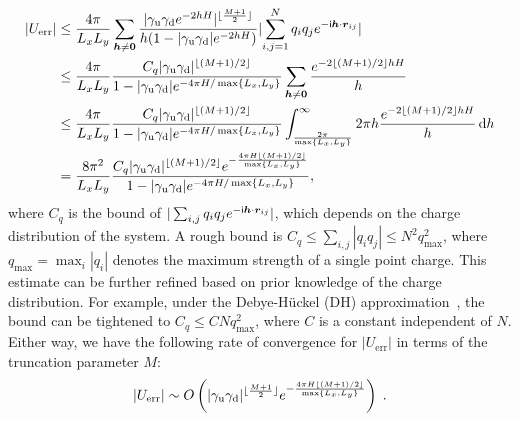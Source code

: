 \begin{equation}\label{eq:U_gamma_bound}
    \begin{split}
        \left|U_{\text{err}}\right| & \leq \frac{4 \pi}{L_x L_y}  \sum_{\bm{h}\neq \bm{0}}  \frac{\lvert\gamma_{\text{u}} \gamma_{\text{d}} e^{- 2 hH}\rvert^{\lfloor \frac{M + 1}{2} \rfloor}}{h(1 - \lvert\gamma_{\text{u}} \gamma_{\text{d}}\rvert e^{- 2hH})}\lvert\sum_{i,j=1}^{N}q_i q_j e^{-\mathsf i \bm{h}\cdot\bm{r}_{ij}}\rvert \\
        & \leq \frac{4\pi}{L_x L_y} \frac{C_{q} \lvert\gamma_{\text{u}} \gamma_{\text{d}}\rvert^{\lfloor{(M+1)/2}\rfloor}}{1 - \lvert\gamma_{\text{u}} \gamma_{\text{d}}\rvert e^{- 4\pi H / \max\{L_x,L_y\}}} \sum_{\bm{h}\neq \bm{0}} \frac{e^{- 2 \lfloor{(M+1)/2}\rfloor hH}}{h}\\
        & \leq \frac{4\pi}{L_x L_y} \frac{C_{q} \lvert\gamma_{\text{u}} \gamma_{\text{d}}\rvert^{\lfloor{(M+1)/2}\rfloor}}{1 - \lvert\gamma_{\text{u}} \gamma_{\text{d}}\rvert e^{- 4\pi H / \max\{L_x,L_y\}}} \int_{\frac{2\pi}{\max\{L_x,L_y\}}}^{\infty} 2\pi h \frac{e^{- 2 \lfloor{(M+1)/2}\rfloor hH}}{h} \, \mathrm{d}h \\
        & = \frac{8 \pi^2}{L_x L_y} \frac{C_{q} \lvert\gamma_{\text{u}} \gamma_{\text{d}}\rvert^{\lfloor{(M+1)/2}\rfloor} e^{-\frac{4 \pi H \lfloor{(M+1)/2}\rfloor}{\max\{L_x,L_y\}}}}{1 - \lvert\gamma_{\text{u}} \gamma_{\text{d}}\rvert e^{- 4\pi H / \max\{L_x,L_y\}}},
    \end{split}
\end{equation}
where $C_q$ is the bound of $|\sum_{i,j}q_iq_je^{-\mathsf i \bm{h}\cdot\bm{r}_{ij}}|$, which depends on the charge distribution of the system. 
A rough bound is $C_q\leq \sum_{i,j}|q_iq_j|\leq N^2q_{\text{max}}^2$, where $q_{\text{max}}=\max_{i}|q_i|$ denotes the maximum strength of a single point charge. 
This estimate can be further refined based on prior knowledge of the charge distribution. 
For example, under the Debye-H\"uckel (DH) approximation~\cite{levin2002electrostatic,gan2024fast}, the bound can be tightened to $C_q\leq CNq_{\max}^2$, where $C$ is a constant independent of $N$. 
Either way, we have the following rate of convergence for $|U_{\text{err}}|$ in terms of the truncation parameter $M$:
\begin{equation}\label{eq:Uerr}
|U_{\text{err}}|\sim O\left(\lvert\gamma_{\text{u}} \gamma_{\text{d}}\rvert^{\lfloor\frac{M+1}{2}\rfloor} e^{-\frac{4 \pi H \lfloor (M + 1)/2\rfloor}{\max\{L_x,L_y\}}}\right)\;.
\end{equation}

